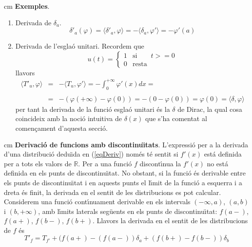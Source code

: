 \documentclass{article}
\def\R{\mathbb R}
\begin{document}
 cm
\noindent
\textbf{Exemples}.
\begin{enumerate}[Exemple 1.]
\item Derivada de $\delta_a$. 
\[
\delta'_a(\varphi)=\langle \delta'_a, \varphi \rangle=
-\langle \delta_a, \varphi' \rangle = -\varphi'(a)
\]
\item Derivada de l'esgla\'o unitari. Recordem que 
\[
u(t)=\begin{cases}
1 & \mathrm{si} \qquad t >=0\\
0 & \mathrm{resta}
\end{cases}
\]
\noindent
llavors 
\[
\begin{array}{lcl}
\langle T'_u, \varphi \rangle & = & -\langle T_u, \varphi' \rangle =
-\int_0^{+\infty} \varphi'(x) dx=\\
\\
 & = & -(\varphi(+\infty)-\varphi(0))=-(0-\varphi(0))=
\varphi(0)=\langle \delta, \varphi \rangle 
\end{array}
\]
\noindent
per tant la derivada de la funci\'o esgla\'o unitari \'es la $\delta$ de 
Dirac, la qual cosa coincideix amb la noci\'o intuitiva de $\delta(x)$ 
que s'ha comentat al comen\c{c}ament d'aquesta secci\'o.
\end{enumerate}

 cm
\noindent
\textbf{Derivaci\'o de funcions amb discontinu\"\i tats}. L'expressi\'o
per a la derivada d'una distribuci\'o dedu\"\i da en (\ref{eqDeriv})
nom\'es t\'e sentit si $f'(x)$ est\'a definida per a tots els valors de
$\R$. Per a una funci\'o $f$ discont\'\i nua la $f'(x)$ no est\'a 
definida en els punts de discontinu\"\i tat. No obstant, si la funci\'o 
\'es derivable entre els punts de discontinu\"\i tat i en aquests punts 
el l\'\i mit de la funci\'o a esquerra i a dreta \'es finit, la derivada 
en el sentit de les distribucions es pot calcular.
\newline
Considerem una funci\'o cont\'\i nuament derivable en els intervals 
$(-\infty, a)$, $(a, b)$ i $(b, +\infty)$, amb l\'\i mits laterals 
seg\"uents en els punts de discontinu\"\i tat: $f(a-)$, $f(a+)$,
$f(b-)$, $f(b+)$. Llavors la derivada en el sentit de les distribucions
de $f$ \'es
\[
T'_f = T_{f'} + (f(a+)-(f(a-)) \delta_a + (f(b+)-f(b-)) \delta_b
\]
\end{document}
